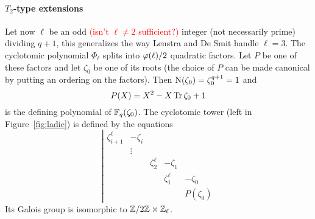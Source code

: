 \documentclass{sig-alternate}
\newcommand{\todo}[1]{\textcolor{red}{(#1)}}
\begin{document}
\paragraph{$T_2$-type extensions}
Let now $\ell$ be an odd \todo{isn't $\ell\ne2$ sufficient?} integer
(not necessarily prime) dividing $q+1$, this generalizes the way
Lenstra and De Smit handle $\ell=3$. The cyclotomic polynomial
$\Phi_\ell$ splits into $\varphi(\ell)/2$ quadratic factors. Let $P$ be
one of these factors and let $\zeta_0$ be one of its roots (the choice
of $P$ can be made canonical by putting an ordering on the
factors). Then $\operatorname{N}(\zeta_0)=\zeta_0^{q+1}=1$ and
\begin{equation}
  \label{eq:quad-factor}
  P(X) = X^2 - X\operatorname{Tr}\zeta_0 + 1
\end{equation}
is the defining polynomial of $\mathbb{F}_q(\zeta_0)$. The cyclotomic tower (left
in Figure~\ref{fig:ladic}) is defined by the equations
\begin{equation}
  \label{eq:T2}
  \left|
  \begin{array}{rrrrr}
    \zeta_{i+1}^\ell &- \zeta_i\\
    &\vdots\\
    &&\zeta_2^\ell &- \zeta_1\\
              &&&\zeta_1^\ell &- \zeta_0\\
              &&&&P(\zeta_0)
  \end{array}
  \right.
\end{equation}
Its Galois group is isomorphic to $\mathbb{Z}/2\mathbb{Z}\times\mathbb{Z}_\ell$. 
\end{document}
